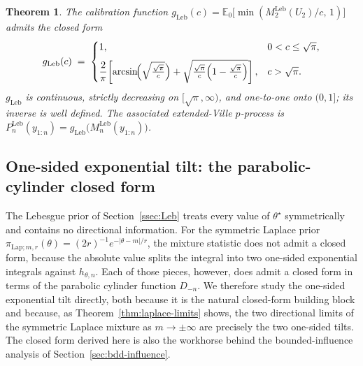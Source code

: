 \documentclass[numsec,webpdf,modern,medium,namedate]{oup-authoring-template}
\theoremstyle{thmstyleone}%
\newtheorem{theorem}{Theorem}%
\theoremstyle{thmstyletwo}%
\theoremstyle{thmstylethree}%
\newcommand{\E}{\mathbb{E}}
\newcommand{\dd}{\,\mathrm{d}}
\newcommand{\Leb}{\mathrm{Leb}}
\newcommand{\1}{\mathbf{1}}
\begin{document}

\begin{theorem}\label{thm:gLeb}
The calibration function
\(g_{\Leb}(c)=\E_0\bigl[\min(M_2^{\Leb}(U_2)/c,\,1)\bigr]\)
admits the closed form
\begin{equation}\label{eq:gLeb}
  g_{\Leb}(c)
  \;=\;
  \begin{cases}
   1, & 0<c\leq\sqrt\pi,\\[6pt]
   \dfrac{2}{\pi}\!\left[
     \arcsin\!\Bigl(\sqrt{\tfrac{\sqrt\pi}{c}}\Bigr)
     +\sqrt{\tfrac{\sqrt\pi}{c}\Bigl(1-\tfrac{\sqrt\pi}{c}\Bigr)}\right],
   & c>\sqrt\pi.
  \end{cases}
\end{equation}
\(g_{\Leb}\) is continuous, strictly decreasing on \([\sqrt\pi,\infty)\),
and one-to-one onto \((0,1]\); its inverse is well defined. The associated extended-Ville $p$-process is
\(P_n^{\Leb}(y_{1:n})=g_{\Leb}\bigl(M_n^{\Leb}(y_{1:n})\bigr)\).
\end{theorem}
\subsection{One-sided exponential tilt: the parabolic-cylinder closed form}\label{sec:exptilt}

The Lebesgue prior of Section~\ref{ssec:Leb} treats every value of $\theta^\star$ symmetrically and contains no directional information. For the symmetric Laplace prior $\pi_{\mathrm{Lap};m,r}(\theta) =(2r)^{-1}e^{-|\theta-m|/r}$, the mixture statistic does not admit a closed form, because the absolute value splits the integral into two one-sided exponential integrals against $h_{\theta,n}$. Each of those pieces, however, does admit a closed form in terms of the parabolic cylinder function $D_{-n}$. We therefore study the one-sided exponential tilt directly, both because it is the natural closed-form building block and because, as Theorem~\ref{thm:laplace-limits} shows, the two
directional limits of the symmetric Laplace mixture as $m\to\pm\infty$ are precisely the two one-sided tilts. The closed form derived here is also the workhorse behind the bounded-influence analysis of
Section~\ref{sec:bdd-influence}.
\end{document}
